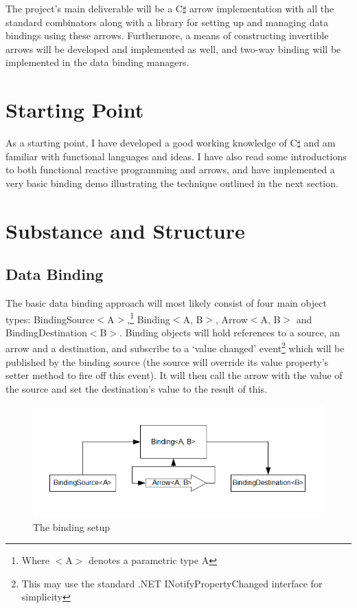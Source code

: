 \documentclass[12pt,a4]{article}
\begin{document}
	The project's main deliverable will be a C$\sharp$ arrow implementation with all the standard combinators along with a library for setting up and managing data bindings using these arrows. Furthermore, a means of constructing invertible arrows will be developed and implemented as well, and two-way binding will be implemented in the data binding managers.

\section{Starting Point}

	As a starting point, I have developed a good working knowledge of C$\sharp$ and am familiar with functional languages and ideas. I have also read some introductions to both functional reactive programming and arrows, and have implemented a very basic binding demo illustrating the technique outlined in the next section.

\section{Substance and Structure}

	\subsection{Data Binding}
		The basic data binding approach will most likely consist of four main object types: Binding\-Source$<$A$>$,\footnote{Where $<$A$>$ denotes a parametric type A} Binding$<$A, B$>$, Arrow$<$A, B$>$ and Binding\-Destin\-ation$<$B$>$. Binding objects will hold references to a source, an arrow and a destination, and subscribe to a `value changed' event\footnote{This may use the standard .NET INotifyPropertyChanged interface for simplicity\cite{notifypropertychanged}} which will be published by the binding source (the source will override its value property's setter method to fire off this event). It will then call the arrow with the value of the source and set the destination's value to the result of this.
		
		\begin{figure}[htb]
			\centering
			\includegraphics[scale=0.7]{Binding.png}
			\caption{The binding setup}
		\end{figure}
		
\end{document}
